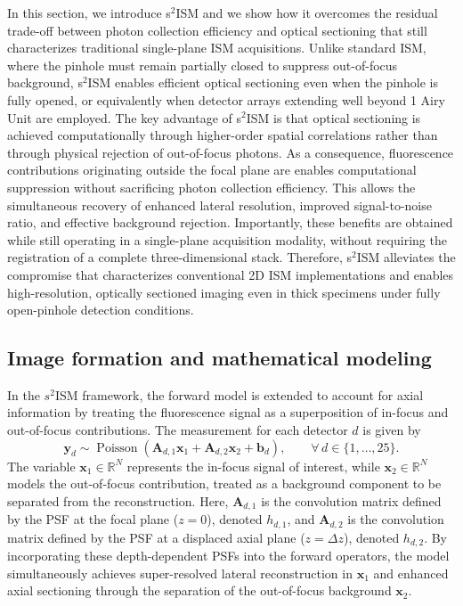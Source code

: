 \documentclass[letterpaper]{article}
\newcommand{\x}{\mathbf{x}}
\newcommand{\A}{\mathbf{A}}
\newcommand{\R}{\mathbb{R}}
\begin{document}
In this section, we introduce s$^2$ISM and we show how it overcomes the residual trade-off between photon collection efficiency and optical sectioning that still characterizes traditional single-plane ISM acquisitions. Unlike standard ISM, where the pinhole must remain partially closed to suppress out-of-focus background, s$^2$ISM enables efficient optical sectioning even when the pinhole is fully opened, or equivalently when detector arrays extending well beyond 1 Airy Unit are employed.
The key advantage of s$^2$ISM is that optical sectioning is achieved computationally through higher-order spatial correlations rather than through physical rejection of out-of-focus photons. As a consequence, fluorescence contributions originating outside the focal plane are enables computational suppression without sacrificing photon collection efficiency. This allows the simultaneous recovery of enhanced lateral resolution, improved signal-to-noise ratio, and effective background rejection.
Importantly, these benefits are obtained while still operating in a single-plane acquisition modality, without requiring the registration of a complete three-dimensional stack. Therefore, s$^2$ISM alleviates the compromise that characterizes conventional 2D ISM implementations and enables high-resolution, optically sectioned imaging even in thick specimens under fully open-pinhole detection conditions. 

\subsection{Image formation and mathematical modeling} \label{sec: mathematical modeling for $s^2ISM$}
In the $s^2$ISM framework, the forward model is extended to account 
for axial information by treating the fluorescence signal as a superposition of 
in-focus and out-of-focus contributions. The measurement for each detector $d$ 
is given by
\begin{equation}
\label{eq:s2_forward}
\mathbf{y}_d
\sim
\operatorname{Poisson}
\left(
\A_{d,1}\x_1
+
\A_{d,2}\x_2
+
\mathbf{b}_d
\right),
\qquad
\forall\, d \in \{1,\dots,25\}.
\end{equation}
The variable $\x_1 \in \R^N$ represents the in-focus signal of interest, while 
$\x_2 \in \R^N$ models the out-of-focus contribution, treated as a background 
component to be separated from the reconstruction. Here, $\A_{d,1}$ is the 
convolution matrix defined by the PSF at the focal plane ($z = 0$), denoted 
$h_{d,1}$, and $\A_{d,2}$ is the convolution matrix defined by the PSF at a 
displaced axial plane ($z = \Delta z$), denoted $h_{d,2}$. By incorporating 
these depth-dependent PSFs into the forward operators, the model simultaneously 
achieves super-resolved lateral reconstruction in $\x_1$ and enhanced axial 
sectioning through the separation of the out-of-focus background $\x_2$.
\end{document}
